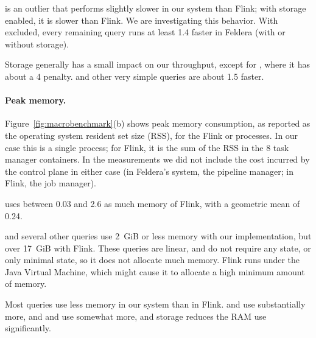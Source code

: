 is an outlier that performs slightly slower in our system
than Flink; with storage enabled, it is slower than Flink.  We are
investigating this behavior.  With  excluded, every
remaining query runs at least 1.4\x{} faster in Feldera (with or
without storage).

Storage generally has a small impact on our throughput, except for
, where it has about a 4\x{} penalty.   and other
very simple queries are about 1.5\x{} faster.

\paragraph{Peak memory.}

Figure~\ref{fig:macrobenchmark}(b) shows peak memory consumption, as
reported as the operating system resident set size (RSS), for the
Flink or \dbsp processes.  In our case this is a single process; for
Flink, it is the sum of the RSS in the 8 task manager containers.  In
the measurements we did not include the cost incurred by the control
plane in either case (in Feldera's system, the pipeline manager; in
Flink, the job manager).

\dbsp uses between 0.03\x{} and 2.6\x{} as much memory of Flink, with a
geometric mean of 0.24\x{}.

 and several other queries use 2~GiB or less memory with our
implementation, but over 17~GiB with Flink.  These queries are linear,
and do not require any state, or only minimal state, so it does not
allocate much memory.  Flink runs under the Java Virtual Machine,
which might cause it to allocate a high minimum amount of memory.

Most queries use less memory in our system than in Flink.  
and  use substantially more, and  and
 use somewhat more, and storage reduces the RAM use
significantly.
